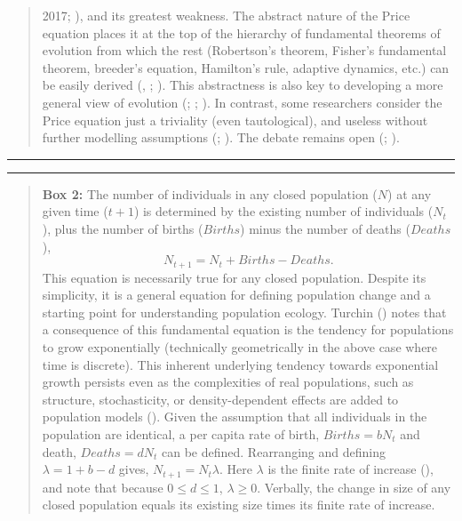 \documentclass[
]{article}
\begin{document}
\begin{quote}
{2017}; ), and its
greatest weakness. The abstract nature of the Price equation places it
at the top of the hierarchy of fundamental theorems of evolution from
which the rest (Robertson's theorem, Fisher's fundamental theorem,
breeder's equation, Hamilton's rule, adaptive dynamics, etc.) can be
easily derived (,
; ). This abstractness is also key to developing a more general view
of evolution (;
;
). In contrast, some
researchers consider the Price equation just a triviality (even
tautological), and useless without further modelling assumptions
(;
). The debate
remains open (;
).
\end{quote}

\begin{center}\rule{0.5\linewidth}{0.5pt}\end{center}

\begin{center}\rule{0.5\linewidth}{0.5pt}\end{center}

\begin{quote}
\textbf{Box 2:} The number of individuals in any closed population
(\(N\)) at any given time (\(t + 1\)) is determined by the existing
number of individuals (\(N_{t}\)), plus the number of births
(\(Births\)) minus the number of deaths (\(Deaths\)),
\[N_{t+1} = N_{t} + Births - Deaths.\] This equation is necessarily true
for any closed population. Despite its simplicity, it is a general
equation for defining population change and a starting point for
understanding population ecology. Turchin
() notes that a consequence of this
fundamental equation is the tendency for populations to grow
exponentially (technically geometrically in the above case where time is
discrete). This inherent underlying tendency towards exponential growth
persists even as the complexities of real populations, such as
structure, stochasticity, or density-dependent effects are added to
population models (). Given the
assumption that all individuals in the population are identical, a per
capita rate of birth, \(Births = bN_{t}\) and death, \(Deaths = dN_{t}\)
can be defined. Rearranging and defining \(\lambda = 1 + b - d\) gives,
\(N_{t+1} = N_{t}\lambda\). Here \(\lambda\) is the finite rate of
increase (), and note that
because \(0 \leq d \leq 1\), \(\lambda \geq 0\). Verbally, the change in
size of any closed population equals its existing size times its finite
rate of increase.
\end{quote}
\end{document}
